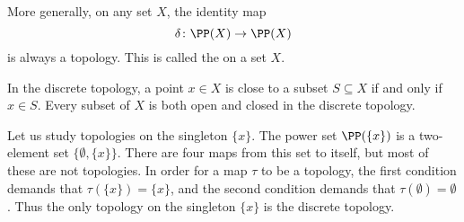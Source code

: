 \begin{exm}
	More generally, on any set $ X $, the identity map
	\[
		\delta \colon \PP(X) \to \PP(X)
	\]
	is always a topology.
	This is called the  on a set $ X $.

	In the discrete topology, a point $ x \in X $ is close to a subset $ S \subseteq X $ if and only if $ x \in S $.
	Every subset of $ X $ is both open and closed in the discrete topology.
\end{exm}

\begin{exm}
	Let us study topologies on the singleton $ \{ x \} $.
	The power set $ \PP( \{ x \} ) $ is a two-element set $ \{ \emptyset, \{ x \} \} $.
	There are four maps from this set to itself, but most of these are not topologies.
	In order for a map $ \tau $ to be a topology, the first condition demands that $ \tau( \{ x \} ) = \{ x \} $, and the second condition demands that $ \tau ( \emptyset ) = \emptyset $.
	Thus the only topology on the singleton $ \{ x \} $ is the discrete topology.
\end{exm}

